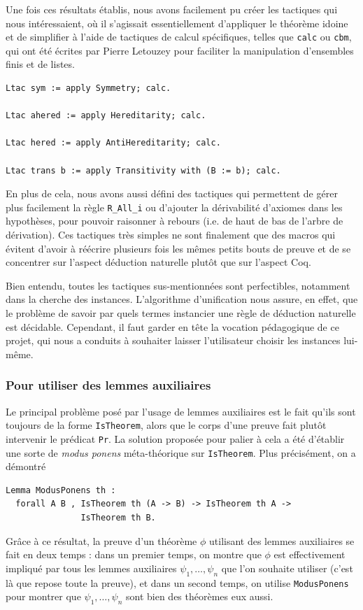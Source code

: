 \documentclass[a4paper]{article}
\begin{document}
Une fois ces résultats établis, nous avons facilement pu créer les tactiques qui nous intéressaient, où il s'agissait essentiellement d'appliquer le théorème idoine et de simplifier à l'aide de tactiques de calcul spécifiques, telles que \verb+calc+ ou \verb+cbm+, qui ont été écrites par Pierre Letouzey pour faciliter la manipulation d'ensembles finis et de listes.
\begin{verbatim}
Ltac sym := apply Symmetry; calc.

Ltac ahered := apply Hereditarity; calc.

Ltac hered := apply AntiHereditarity; calc.

Ltac trans b := apply Transitivity with (B := b); calc.
\end{verbatim}
\smallskip

En plus de cela, nous avons aussi défini des tactiques qui permettent de gérer plus facilement la règle \verb+R_All_i+ ou d'ajouter la dérivabilité d'axiomes dans les hypothèses, pour pouvoir raisonner à rebours (i.e. de haut de bas de l'arbre de dérivation). Ces tactiques très simples ne sont finalement que des macros qui évitent d'avoir à réécrire plusieurs fois les mêmes petits bouts de preuve et de se concentrer sur l'aspect déduction naturelle plutôt que sur l'aspect Coq.
\smallskip

Bien entendu, toutes les tactiques sus-mentionnées sont perfectibles, notamment dans la cherche des instances. L'algorithme d'unification nous assure, en effet, que le problème de savoir par quels termes instancier une règle de déduction naturelle est décidable. Cependant, il faut garder en tête la vocation pédagogique de ce projet, qui nous a conduits à souhaiter laisser l'utilisateur choisir les instances lui-même.

\subsubsection{Pour utiliser des lemmes auxiliaires}\label{sol}

Le principal problème posé par l'usage de lemmes auxiliaires est le fait qu'ils sont toujours de la forme \verb+IsTheorem+, alors que le corps d'une preuve fait plutôt intervenir le prédicat \verb+Pr+. La solution proposée pour palier à cela a été d'établir une sorte de \emph{modus ponens} méta-théorique sur \verb+IsTheorem+. Plus précisément, on a démontré
\begin{verbatim}
Lemma ModusPonens th :
  forall A B , IsTheorem th (A -> B) -> IsTheorem th A ->
               IsTheorem th B.

\end{verbatim}
Grâce à ce résultat, la preuve d'un théorème $\phi$ utilisant des lemmes auxiliaires se fait en deux temps : dans un premier temps, on montre que $\phi$ est effectivement impliqué par tous les lemmes auxiliaires $\psi_1, \ldots, \psi_n$ que l'on souhaite utiliser (c'est là que repose toute la preuve), et dans un second temps, on utilise \verb+ModusPonens+ pour montrer que $\psi_1, \ldots, \psi_n$ sont bien des théorèmes eux aussi.
\end{document}
